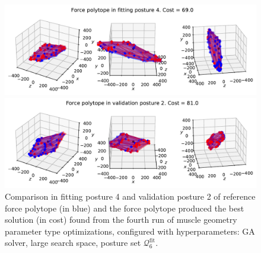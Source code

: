 \clearpage
\begin{figure}[!htb]
    \centering
    \captionsetup{justification=centering}
    
    \begin{minipage}{0.8\linewidth}
        \captionsetup{justification=centering}
        \centering
        \includegraphics[trim={0 0 0 0}, clip, width=1\linewidth]{img/chapter_4/reconstruction_stanford_imgs/polytope_genetic_p6_points_small_output_3215105_trial_2_fitting_posture_4_with_stanford.pdf}
    \end{minipage}
    \begin{minipage}{0.8\linewidth}
        \captionsetup{justification=centering}
        \centering
        \includegraphics[trim={0 0 0 0}, clip, width=1\linewidth]{img/chapter_4/reconstruction_stanford_imgs/polytope_genetic_p6_points_small_output_3215105_trial_2_val_posture_2_with_stanford.pdf}
    \end{minipage}
    \caption{Comparison in fitting posture 4 and validation posture 2 of reference force polytope (in blue) and the force polytope produced the best solution (in cost) found from the fourth run of muscle geometry parameter type optimizations, configured with hyperparameters: GA solver, large search space, posture set $\mathcal{Q}_6^{\text{fit}}$.}
    \label{fig:polytope_genetic_p6_points_small_output_3215105_trial_2_fitting_posture_4}
\end{figure}


